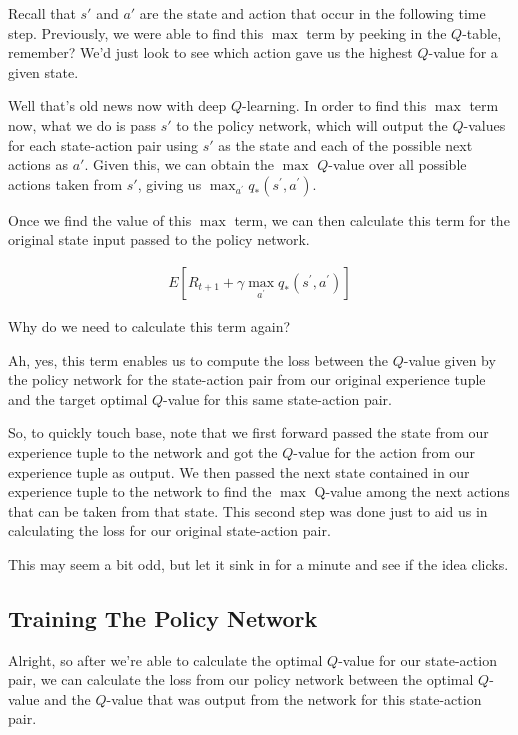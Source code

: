 Recall that $s'$ and $a'$ are the state and action that occur in the following time step. 
Previously, we were able to find this $\max$ term by peeking in the $Q$-table, remember? 
We'd just look to see which action gave us the highest $Q$-value for a given state.

Well that's old news now with deep $Q$-learning. In order to find this $\max$ term now, 
what we do is pass $s'$ to the policy network, which will output the $Q$-values for each 
state-action pair using $s'$ as the state and each of the possible next actions as $a'$. 
Given this, we can obtain the $\max$ $Q$-value over all possible actions taken from $s'$, 
giving us $\max_{a^{\prime }}q_{\ast }\left( s^\prime,a^{\prime }\right)$.

Once we find the value of this $\max$ term, we can then calculate this term for the 
original state input passed to the policy network.

\begin{eqnarray*}
E\left[ R_{t+1}+\gamma \max_{a^{\prime }}q_{\ast }\left( s^\prime,a^{\prime }\right)\right]
\end{eqnarray*}
 
Why do we need to calculate this term again?

Ah, yes, this term enables us to compute the loss between the $Q$-value given by the 
policy network for the state-action pair from our original experience tuple and the target 
optimal $Q$-value for this same state-action pair.

So, to quickly touch base, note that we first forward passed the state from our experience 
tuple to the network and got the $Q$-value for the action from our experience tuple as 
output. We then passed the next state contained in our experience tuple to the network to 
find the $\max$ Q-value among the next actions that can be taken from that state. This 
second step was done just to aid us in calculating the loss for our original state-action 
pair.

This may seem a bit odd, but let it sink in for a minute and see if the idea clicks.


\subsection{Training The Policy Network}

Alright, so after we're able to calculate the optimal $Q$-value for our state-action pair, 
we can calculate the loss from our policy network between the optimal $Q$-value and the 
$Q$-value that was output from the network for this state-action pair.

